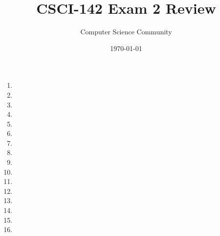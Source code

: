 \documentclass[11pt]{article}
\title{CSCI-142 Exam 2 Review}
\author{Computer Science Community}
\date{\today}
\begin{document}
\header
\begin{enumerate}

\item 

\item 

\item 

\item 

\item 

\item 

\item 

\newpage
\item 

\item 

\item 

\item 

\item 

\newpage
\item 

\item 

\item 

\newpage
\item 

\end{enumerate}
\end{document}
